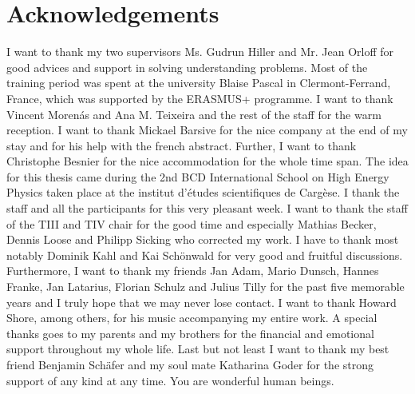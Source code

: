 \newpage
\section*{Acknowledgements}
I want to thank my two supervisors Ms. Gudrun Hiller and Mr. Jean Orloff for good advices and support in solving understanding problems. Most of
the training period was spent at the university Blaise Pascal in Clermont-Ferrand, France, which was supported by the ERASMUS+ programme. I want
to thank Vincent Morenás and Ana M. Teixeira and the rest of the staff for the warm reception. I want to thank Mickael Barsive for the nice company at the end of my stay and for his
help with the french abstract. Further, I want to thank Christophe Besnier for the nice accommodation for the whole time span. The idea for this 
thesis came during the 2nd BCD International School on High Energy Physics taken place at the institut d'études scientifiques de Cargèse. I thank
the staff and all the participants for this very pleasant week. I want to thank the staff of the TIII and TIV chair for the good time and especially Mathias Becker,
Dennis Loose and Philipp Sicking who corrected my work. I have to thank most notably Dominik Kahl and Kai Schönwald for very good and fruitful 
discussions. Furthermore, I want to thank my friends Jan Adam, Mario Dunsch, Hannes Franke, Jan Latarius, Florian Schulz and Julius Tilly for the past 
five memorable years and I truly hope that we may never lose contact. I want to thank Howard Shore, among others, for his music accompanying
my entire work. A special thanks goes to my parents and my brothers for the financial and emotional support throughout my whole life. Last but not least
I want to thank my best friend Benjamin Schäfer and my soul mate Katharina Goder for the strong support of any kind at any time. You are wonderful
human beings.



